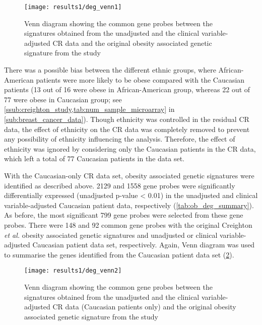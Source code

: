 \begin{figure}[htpb]
	\centering
	\texttt{[image: results1/deg\_venn1]}
	\caption[Venn diagram of the \glspl{deg} identified from the CR data (all patients included)]{Venn diagram showing the common gene probes between the signatures obtained from the unadjusted and the clinical variable-adjusted CR data and the original obesity associated genetic signature from the \citet{Creighton2012} study }
	\label{fig:venn1}
\end{figure}

\noindent
There was a possible bias between the different ethnic groups, where African-American patients were more likely to be obese compared with the Caucasian patients (13 out of 16 were obese in African-American group, whereas 22 out of 77 were obese in Caucasian group; see \cref{ssub:creighton_study,tab:num_sample_microarray} in \cref{sub:breast_cancer_data}).
Though ethnicity was controlled in the residual CR data, the effect of ethnicity on the CR data was completely removed to prevent any possibility of ethnicity influencing the analysis.
Therefore, the effect of ethnicity was ignored by considering only the Caucasian patients in the CR data, which left a total of 77 Caucasian patients in the data set.

With the Caucasian-only CR data set, obesity associated genetic signatures were identified as described above.
2129 and 1558 gene probes were significantly differentially expressed (unadjusted p-value \textless{} 0.01) in the unadjusted and clinical variable-adjusted Caucasian patient data, respectively (\cref{tab:ob_deg_summary}).
As before, the most significant 799 gene probes were selected from these gene probes.
There were 148 and 92 common gene probes with the original Creighton \textit{et al.} obesity associated genetic signatures and unadjusted or clinical variable-adjusted Caucasian patient data set, respectively.
Again, Venn diagram was used to summarise the genes identified from the Caucasian patient data set (\cref{fig:venn2}).

\begin{figure}[tb]
	\centering
	\texttt{[image: results1/deg\_venn2]}
	\caption[Venn diagram of the \glspl{deg} identified from the CR data (Caucasian patients only)]{Venn diagram showing the common gene probes between the signatures obtained from the unadjusted and the clinical variable-adjusted CR data (Caucasian patients only) and the original obesity associated genetic signature from the \citet{Creighton2012} study}
	\label{fig:venn2}
\end{figure}

